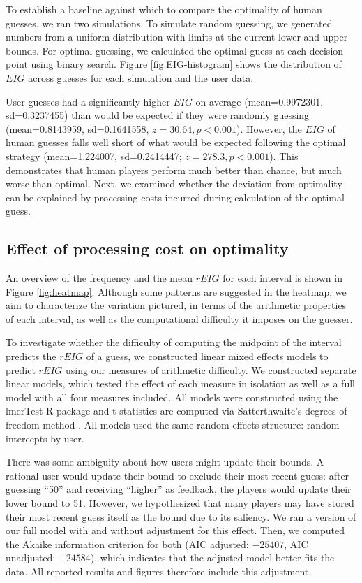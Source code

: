 \documentclass[10pt,letterpaper]{article}
\begin{document}
To establish a baseline against which to compare the optimality of human guesses, we ran two simulations. To simulate random guessing, we generated numbers from a uniform distribution with limits at the current lower and upper bounds. For optimal guessing, we calculated the optimal guess at each decision point using binary search. Figure \ref{fig:EIG-histogram} shows the distribution of $EIG$ across guesses for each simulation and the user data.

User guesses had a significantly higher $EIG$ on average (mean=\num{0.9972301}, sd=\num{0.3237455}) than would be expected if they were randomly guessing (mean=\num{0.8143959}, sd=\num{0.1641558}, $z = 30.64, p<0.001$). However, the $EIG$ of human guesses falls well short of what would be expected following the optimal strategy (mean=\num{1.224007}, sd=\num{0.2414447}; $z = 278.3, p<0.001$).
This demonstrates that human players perform much better than chance, but much worse than optimal. Next, we examined whether the deviation from optimality can be explained by processing costs incurred during calculation of the optimal guess.

\subsection{Effect of processing cost on optimality}

An overview of the frequency and the mean $rEIG$ for each interval is shown in Figure \ref{fig:heatmap}. Although some patterns are suggested in the heatmap, we aim to characterize the variation pictured, in terms of the arithmetic properties of each interval, as well as the computational difficulty it imposes on the guesser.

To investigate whether the difficulty of computing the midpoint of the interval predicts the $rEIG$ of a guess, we constructed linear mixed effects models to predict $rEIG$ using our measures of arithmetic difficulty. We constructed separate linear models, which tested the effect of each measure in isolation as well as a full model with all four measures included. All models were constructed using the lmerTest R package \cite{LukeEvaluatingsignificancelinear2017} and t statistics are computed via Satterthwaite's degrees of freedom method \cite{SatterthwaiteApproximateDistributionEstimates1946,LukeEvaluatingsignificancelinear2017}. All models used the same random effects structure: random intercepts by user.

There was some ambiguity about how users might update their bounds. A rational user would update their bound to exclude their most recent guess: after guessing “50” and receiving “higher” as feedback, the players would update their lower bound to 51. However, we hypothesized that many players may have stored their most recent guess itself as the bound due to its saliency. We ran a version of our full model with and without adjustment for this effect. Then, we computed the Akaike information criterion for both (AIC adjusted: $-25407$, AIC unadjusted: $-24584$), which indicates that the adjusted model better fits the data. All reported results and figures therefore include this adjustment.
\end{document}
